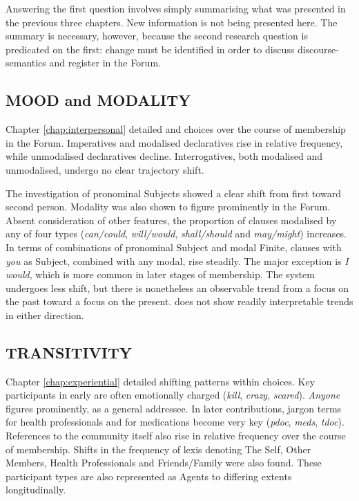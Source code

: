 Answering the first question involves simply summarising what was presented in the previous three chapters. New information is not being presented here. The summary is necessary, however, because the second research question is predicated on the first:  change must be identified in order to discuss \glspl{discourse-semantic} and register in the \gls{Forum}. 

\subsection{MOOD and MODALITY}

Chapter \ref{chap:interpersonal} detailed  and  choices over the course of membership in the \gls{Forum}. Imperatives and modalised declaratives rise in relative frequency, while unmodalised declaratives decline. Interrogatives, both modalised and unmodalised, undergo no clear trajectory shift.

The investigation of pronominal Subjects showed a clear shift from first toward second person. Modality was also shown to figure prominently in the \gls{Forum}. Absent consideration of other  features, the proportion of clauses modalised by any of four types (\emph{can\slash could}, \emph{will\slash would}, \emph{shall\slash should} and \emph{may\slash might}) increases. In terms of combinations of pronominal Subject and modal Finite, clauses with \emph{you} as Subject, combined with any modal, rise steadily. The major exception is \emph{I would}, which is more common in later stages of membership. The  system undergoes less shift, but there is nonetheless an observable trend from a focus on the past toward a focus on the present.  does not show readily interpretable trends in either direction.

\subsection{TRANSITIVITY}

Chapter \ref{chap:experiential} detailed shifting patterns within  choices. Key participants in early  are often emotionally charged (\emph{kill}, \emph{crazy}, \emph{scared}). \emph{Anyone} figures prominently, as a general addressee. In later contributions, jargon terms for health professionals and for medications become very key (\emph{pdoc}, \emph{meds}, \emph{tdoc}). References to the community itself also rise in relative frequency over the course of membership. Shifts in the frequency of lexis denoting The Self, Other Members, Health Professionals and Friends\slash Family were also found. These participant types are also represented as Agents to differing extents longitudinally.

